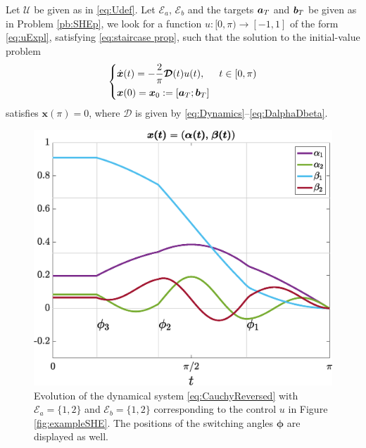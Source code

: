 \documentclass[twocolumn]{autart}    %
\begin{document}
\vspace{0.5em}
\begin{problem}\label{pb:SHEpControl}
Let $\mathcal{U}$ be given as in \eqref{eq:Udef}. Let $\mathcal{E}_a$, $\mathcal{E}_b$ and the targets $\bm{a}_T$ and $\bm{b}_T$ be given as in Problem \ref{pb:SHEp},  we look for a function $u: [0,\pi)\to [-1,1]$ of the form \eqref{eq:uExpl}, satisfying \eqref{eq:staircase prop}, such that the solution to the initial-value problem
	\begin{equation}\label{eq:CauchyReversed}
		\begin{cases}
			\displaystyle\dot{\bm{x}}(t) = -\frac 2\pi\bm{\mathcal{D}}(t)u(t),  & t \in [0,\pi)
			\\[5pt]
			\bm{x}(0) = \bm{x}_0 := [\bm{a}_T; \bm{b}_T]
		\end{cases}
	\end{equation}
	satisfies $\bm{x} (\pi) = 0$, where $\bm{\mathcal{D}}$ is given by \eqref{eq:Dynamics}--\eqref{eq:DalphaDbeta}.
\end{problem}

\begin{figure}[ht!] 
	\centering
	\includegraphics[scale=0.3]{img/fig02.eps}
	\caption{Evolution of the dynamical system \eqref{eq:CauchyReversed} with $\mathcal{E}_a = \{1,2\}$ and $\mathcal{E}_b = \{1,2\}$ corresponding to the control $u$ in Figure \ref{fig:exampleSHE}. The positions of the switching angles $\bm{\phi}$ are displayed as well.}\label{fig:evolution_x}
\end{figure}
\end{document}
